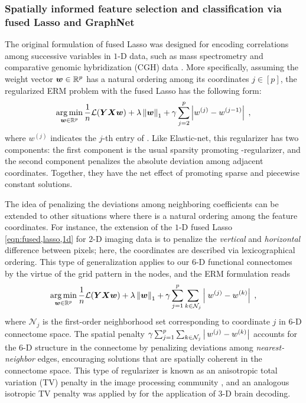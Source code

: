 \subsubsection{Spatially informed feature selection and classification via fused Lasso and GraphNet}
The original formulation of fused Lasso \citep{Tibshirani:2005} was designed for encoding correlations among successive variables in $1$-D data, such as mass spectrometry and comparative genomic hybridization (CGH) data \citep{Gui-Bo-Ye:2011}.
More specifically, assuming the weight vector ${\bm{w}}\in\mathbb{R}^p$ has a natural ordering among its coordinates $j\in[p]$, the regularized ERM problem with the fused Lasso has the following form:
\begin{equation}
	\operatorname*{arg\,min}_{{\bm{w}}\in\mathbb{R}^p}\frac{1}{n}\mathcal{L}({\bm{YXw}}) + \lambda\left\| \bm{w} \right\|_1 + 
		\gamma\sum_{j=2}^p\left| w^{(j)} - w^{(j-1)} \right| \;,
	\label{eqn:fused,lasso,1d}
\end{equation}
where $w^{(j)}$ indicates the $j$-th entry of \w.
Like Elastic-net, this regularizer has two components: the first component is the usual sparsity promoting \ellone-regularizer, and the second component penalizes the absolute deviation among adjacent coordinates.
Together, they have the net effect of promoting sparse and piecewise constant solutions.

The idea of penalizing the deviations among neighboring coefficients can be extended to other situations where there is a natural ordering among the feature coordinates.
For instance, the extension of the $1$-D fused Lasso \eqref{eqn:fused,lasso,1d} for $2$-D imaging data is to penalize the \emph{vertical} and \emph{horizontal} difference between pixels; here, the coordinates are described via lexicographical ordering.
This type of generalization applies to our \mbox{$6$-D} functional connectomes by the virtue of the grid pattern in the nodes, and the ERM formulation reads
\begin{equation}
	\operatorname*{arg\,min}_{{\bm{w}}\in\mathbb{R}^p}\frac{1}{n}\mathcal{L}({\bm{YXw}}) + \lambda\left\| \bm{w} \right\|_1 + 
		\gamma\sum_{j=1}^p\sum_{k\in\mathcal{N}_j} \left| \;w^{(j)}-w^{(k)} \right| \;,
	\label{eqn:fused,lasso,6d}
\end{equation}
where $\mathcal{N}_j$ is the first-order neighborhood set corresponding to coordinate $j$ in \mbox{$6$-D} connectome space.
The spatial penalty $\gamma\sum_{j=1}^p\sum_{k\in\mathcal{N}_j} \left| \,w^{(j)}-w^{(k)} \right|$ accounts for the \mbox{$6$-D} structure in the connectome by penalizing deviations among \emph{nearest-neighbor} edges, encouraging solutions that are spatially coherent in the connectome space.
This type of regularizer is known as an anisotropic total variation (TV) penalty in the image processing community \citep{Wang:2008tv}, and an analogous isotropic TV penalty was applied by \cite{Michel:2011} for the application of $3$-D brain decoding.

